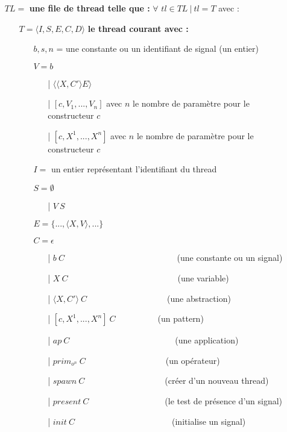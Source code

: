 \documentclass[10pt,a4paper]{report}
\begin{document}
	\begin{itemize}
		\item[] $TL =$ \textbf{une file de thread telle que :} $\forall$ $tl \in TL~|~tl = T$ avec :
		\begin{itemize}
			\item[] $T = \langle I,S,E,C,D\rangle$ \textbf{le thread courant avec :}
			\begin{itemize}
				\item[] $b,s,n$ = une constante ou un identifiant de signal (un entier)
				\item[] $V = b$	
				\begin{itemize}
					\item[|] $\langle\langle X,C' \rangle E\rangle$
					\item[|] $[c,V_{1},...,V_{n}]$ avec $n$ le nombre de paramètre pour le constructeur $c$
					\item[|] $[c,X^{1},...,X^{n}]$ avec $n$ le nombre de paramètre pour le constructeur $c$
				\end{itemize}
				\item[] $I =$ un entier représentant l'identifiant du thread
				\item[] $S =  \emptyset$ 
				\begin{itemize}
					\item[|] $V~S$
				\end{itemize}
				\item[] $E = \{...,\langle X,V\rangle,...\}$
				\item[] $C = \epsilon$
				\begin{itemize}
					\item[|] $b~C$~~~~~~~~~~~~~~~~~~~~~~~~~~ (une constante ou un signal)
					\item[|] $X~C$~~~~~~~~~~~~~~~~~~~~~~~~~~(une variable)
					\item[|] $\langle X,C'\rangle~C$~~~~~~~~~~~~~~~~~~~(une abstraction)
					\item[|] $[c,X^{1},...,X^{n}]~C$~~~~~~~~~~(un pattern)
					\item[|] $ap~C$~~~~~~~~~~~~~~~~~~~~~~~~~(une application)
					\item[|] $prim_{o^{n}}~C$~~~~~~~~~~~~~~~~~~~(un opérateur)
					\item[|] $spawn~C$~~~~~~~~~~~~~~~~~~~(créer d'un nouveau thread)
					\item[|] $present~C$~~~~~~~~~~~~~~~~~~(le test de présence d'un signal)
					\item[|] $init~C$~~~~~~~~~~~~~~~~~~~~~~~(initialise un signal)

\end{itemize}
\end{itemize}
\end{itemize}
\end{itemize}
\end{document}
